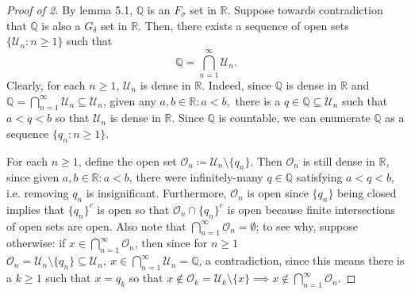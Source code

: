 \begin{proof}[Proof of 2]
	By lemma 5.1, \( \mathbb{Q}  \) is an \( F_\sigma  \) set in \( \mathbb{R} \). Suppose towards contradiction that \( \mathbb{Q}  \) is also a \( G_\delta  \) set in \( \mathbb{R} \). Then, there exists a sequence of open sets \( \{ \mathcal{U}_n : n \geq 1 \}  \) such that \[\mathbb{Q} = \bigcap_{n=1}^{\infty} \mathcal{U}_n.\] Clearly, for each \( n \geq 1 \), \( \mathcal{U}_n  \) is dense in \( \mathbb{R} \). Indeed, since \( \mathbb{Q}  \) is dense in \( \mathbb{R} \) and \( \mathbb{Q} = \bigcap_{n=1}^{\infty} \mathcal{U} _n \subseteq \mathcal{U}_n  \), given any \( a,b \in \mathbb{R}: a<b,\) there is a \( q \in \mathbb{Q} \subseteq \mathcal{U}_n \) such that \( a < q< b \) so that \( \mathcal{U} _n \) is dense in \( \mathbb{R} \). Since \( \mathbb{Q}  \) is countable, we can enumerate \( \mathbb{Q}  \) as a sequence \( \{ q_n : n \geq 1 \}  \).

	For each \( n \geq 1 \), define the open set \( \mathcal{O}_n \coloneqq \mathcal{U}_n \setminus \{ q_n \}  \). Then \( \mathcal{O}_n \) is still dense in \( \mathbb{R} \), since given \( a , b \in \mathbb{R} : a<b \), there were infinitely-many \( q \in \mathbb{Q}  \) satisfying \( a < q < b \), i.e. removing \( q_n \) is insignificant. Furthermore, \( \mathcal{O}_n \) is open since \( \{ q_n \}  \) being closed implies that \( \{ q_n \}^{c}  \) is open so that \( \mathcal{O}_n \cap \{ q_n \}^{c}    \) is open because finite intersections of open sets are open. Also note that \( \bigcap_{n=1}^{\infty} \mathcal{O}_n = \emptyset  \); to see why, suppose otherwise: if \( x \in \bigcap_{n = 1}^{\infty} \mathcal{O}_n \), then since for \( n \geq 1 \) \( \mathcal{O}_n = \mathcal{U}_n \setminus \{ q_n \} \subseteq \mathcal{U}_n, \ x \in \bigcap_{n=1}^{\infty} \mathcal{U}_n  = \mathbb{Q} \), a contradiction, since this means there is a \( k \geq 1 \) such that \( x = q_k \) so that \( x \notin \mathcal{O}_k = \mathcal{U}_k \setminus \{ x \} \implies x \notin \bigcap_{n=1}^{\infty} \mathcal{O}_n.    \)


\end{proof}
